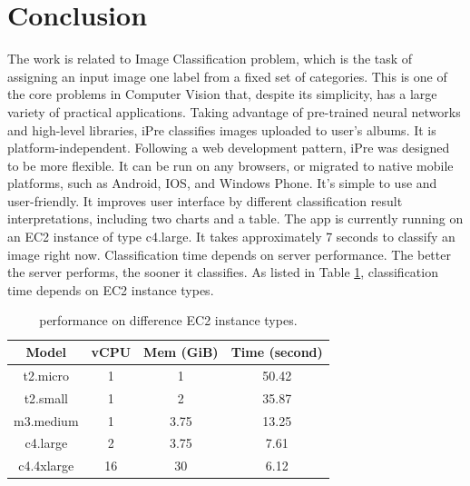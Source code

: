 \documentclass[conference]{IEEEtran}
\begin{document}




\section{Conclusion}
The work is related to Image Classification problem, which is the task of assigning an input image one label from a fixed set of categories. This is one of the core problems in Computer Vision that, despite its simplicity, has a large variety of practical applications. Taking advantage of pre-trained neural networks and high-level libraries, iPre classifies images uploaded to user's albums.
It is platform-independent. Following a web development pattern, iPre was designed to be more flexible. It can be run on any browsers, or migrated to native mobile platforms, such as Android, IOS, and Windows Phone.
It's simple to use and user-friendly. It improves user interface by different classification result interpretations, including two charts and a table.
The app is currently running on an EC2 instance of type c4.large. It takes approximately 7 seconds to classify an image right now. Classification time depends on server performance. The better the server performs, the sooner it classifies. As listed in Table \ref{tab:table1}, classification time depends on EC2 instance types.

\begin{table}[h!]
  \centering
  \caption{performance on difference EC2 instance types.}
  \label{tab:table1}
  \begin{tabular}{cccc}
    \toprule
    Model & vCPU & Mem (GiB) & Time (second)\\
    \midrule
    t2.micro & 1 & 1 & 50.42\\
    t2.small & 1 & 2 & 35.87\\
    m3.medium & 1 & 3.75 & 13.25\\
    c4.large & 2 & 3.75 & 7.61\\
    c4.4xlarge & 16 & 30 & 6.12\\
    \bottomrule
  \end{tabular}
\end{table}
\end{document}
